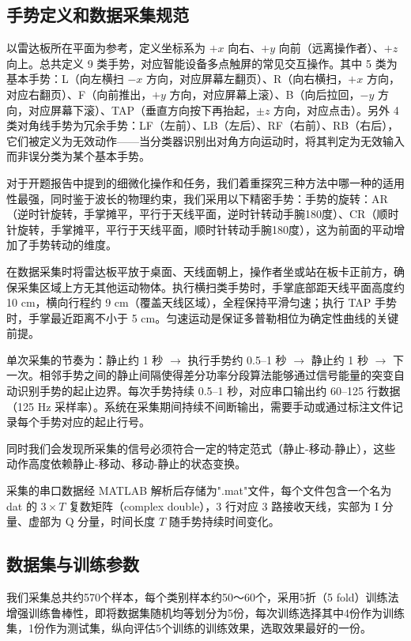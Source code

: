 \subsection{手势定义和数据采集规范}

以雷达板所在平面为参考，定义坐标系为 $+x$ 向右、$+y$ 向前（远离操作者）、$+z$ 向上。总共定义 9 类手势，对应智能设备多点触屏的常见交互操作。其中 5 类为基本手势：L（向左横扫 $-x$ 方向，对应屏幕左翻页）、R（向右横扫，$+x$ 方向，对应右翻页）、F（向前推出，$+y$ 方向，对应屏幕上滚）、B（向后拉回，$-y$ 方向，对应屏幕下滚）、TAP（垂直方向按下再抬起，$\pm z$ 方向，对应点击）。另外 4 类对角线手势为冗余手势：LF（左前）、LB（左后）、RF（右前）、RB（右后），它们被定义为无效动作——当分类器识别出对角方向运动时，将其判定为无效输入而非误分类为某个基本手势。

对于开题报告中提到的细微化操作和任务，我们着重探究三种方法中哪一种的适用性最强，同时鉴于波长的物理约束，我们采用以下精密手势：手势的旋转：AR（逆时针旋转，手掌摊平，平行于天线平面，逆时针转动手腕180度）、CR（顺时针旋转，手掌摊平，平行于天线平面，顺时针转动手腕180度），这为前面的平动增加了手势转动的维度。

在数据采集时将雷达板平放于桌面、天线面朝上，操作者坐或站在板卡正前方，确保采集区域上方无其他运动物体。执行横扫类手势时，手掌底部距天线平面高度约 10 cm，横向行程约 9 cm（覆盖天线区域），全程保持平滑匀速；执行 TAP 手势时，手掌最近距离不小于 5 cm。匀速运动是保证多普勒相位为确定性曲线的关键前提。

单次采集的节奏为：静止约 1 秒 $\rightarrow$ 执行手势约 0.5--1 秒 $\rightarrow$ 静止约 1 秒 $\rightarrow$ 下一次。相邻手势之间的静止间隔使得差分功率分段算法能够通过信号能量的突变自动识别手势的起止边界。每次手势持续 0.5--1 秒，对应串口输出约 60--125 行数据（125 Hz 采样率）。系统在采集期间持续不间断输出，需要手动或通过标注文件记录每个手势对应的起止行号。

同时我们会发现所采集的信号必须符合一定的特定范式（静止-移动-静止），这些动作高度依赖静止-移动、移动-静止的状态变换。

采集的串口数据经 MATLAB 解析后存储为".mat"文件，每个文件包含一个名为 dat 的 $3 \times T$ 复数矩阵（complex double），3 行对应 3 路接收天线，实部为 I 分量、虚部为 Q 分量，时间长度 $T$ 随手势持续时间变化。

\subsection{数据集与训练参数}

我们采集总共约570个样本，每个类别样本约50～60个，采用5折（5 fold）训练法增强训练鲁棒性，即将数据集随机均等划分为5份，每次训练选择其中4份作为训练集，1份作为测试集，纵向评估5个训练的训练效果，选取效果最好的一份。


